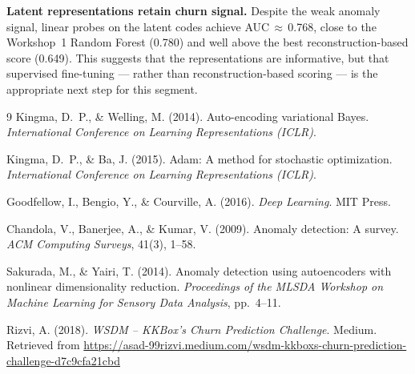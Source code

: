 \documentclass{article}
\begin{document}
\textbf{Latent representations retain churn signal.} Despite the weak anomaly signal,
linear probes on the latent codes achieve AUC\,$\approx$\,0.768, close to the
Workshop~1 Random Forest (0.780) and well above the best reconstruction-based score
(0.649). This suggests that the representations are
informative, but that supervised fine-tuning --- rather than reconstruction-based
scoring --- is the appropriate next step for this segment.

\begin{thebibliography}{9}
Kingma, D.~P., \& Welling, M. (2014). Auto-encoding variational Bayes.
\textit{International Conference on Learning Representations (ICLR)}.

Kingma, D.~P., \& Ba, J. (2015). Adam: A method for stochastic optimization.
\textit{International Conference on Learning Representations (ICLR)}.

Goodfellow, I., Bengio, Y., \& Courville, A. (2016). \textit{Deep Learning}.
MIT Press.

Chandola, V., Banerjee, A., \& Kumar, V. (2009). Anomaly detection: A survey.
\textit{ACM Computing Surveys}, 41(3), 1--58.

Sakurada, M., \& Yairi, T. (2014). Anomaly detection using autoencoders with
nonlinear dimensionality reduction. \textit{Proceedings of the MLSDA Workshop on
Machine Learning for Sensory Data Analysis}, pp.\ 4--11.

Rizvi, A. (2018). \textit{WSDM -- KKBox's Churn Prediction Challenge}. Medium.
Retrieved from \url{https://asad-99rizvi.medium.com/wsdm-kkboxs-churn-prediction-challenge-d7c9cfa21cbd}
\end{thebibliography}
\end{document}
